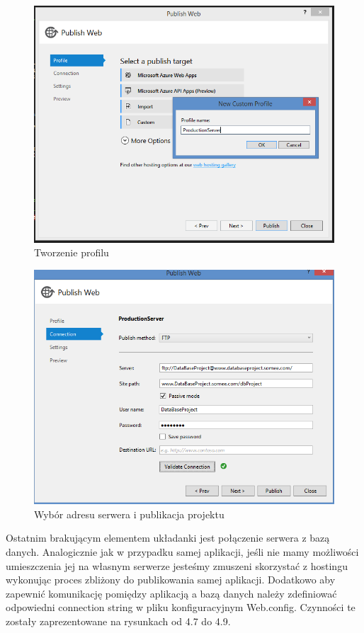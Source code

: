 \documentclass[a4paper,11pt]{article}
\begin{document}
\begin{figure}[h!]
	\centering
	\includegraphics[width=\textwidth,height=0.6\textheight]{vs2.png}
	\caption{Tworzenie profilu}
\end{figure}
\begin{figure}[h!]
	\centering
	\includegraphics[width=\textwidth,height=0.6\textheight]{vs3.png}
	\caption{Wybór adresu serwera i publikacja projektu}
\end{figure}
Ostatnim brakującym elementem układanki jest połączenie serwera z bazą danych. Analogicznie jak w przypadku samej aplikacji, jeśli nie mamy możliwości umieszczenia jej na własnym serwerze jesteśmy zmuszeni skorzystać z hostingu wykonując proces zbliżony do publikowania samej aplikacji. Dodatkowo aby zapewnić komunikację pomiędzy aplikacją a bazą danych należy zdefiniować odpowiedni connection string w pliku konfiguracyjnym Web.config. Czynności te zostały zaprezentowane na rysunkach od 4.7 do 4.9.
\end{document}
